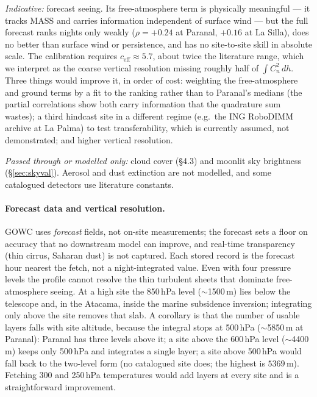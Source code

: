 \documentclass[11pt]{article}
\begin{document}
\emph{Indicative:} forecast seeing. Its free-atmosphere term is physically
meaningful --- it tracks MASS and carries information independent of surface wind ---
but the full forecast ranks nights only weakly ($\rho=+0.24$ at Paranal, $+0.16$ at
La Silla), does no better than surface wind or persistence, and has no site-to-site
skill in absolute scale. The calibration requires $c_{\text{eff}}\approx5.7$, about
twice the literature range, which we interpret as the coarse vertical resolution
missing roughly half of $\int C_n^2\,dh$. Three things would improve it, in order of
cost: weighting the free-atmosphere and ground terms by a fit to the ranking rather
than to Paranal's medians (the partial correlations show both carry information that
the quadrature sum wastes); a third hindcast site in a different regime (e.g.\ the ING
RoboDIMM archive at La Palma) to test transferability, which is currently assumed,
not demonstrated; and higher vertical resolution.

\emph{Passed through or modelled only:} cloud cover (\S4.3) and moonlit sky
brightness (\S\ref{sec:skyval}). Aerosol and dust extinction are not modelled, and
some catalogued detectors use literature constants.

\paragraph{Forecast data and vertical resolution.}
\label{sec:dimm-inv}
GOWC uses \emph{forecast} fields, not on-site measurements; the forecast sets a floor
on accuracy that no downstream model can improve, and real-time transparency (thin
cirrus, Saharan dust) is not captured. Each stored record is the forecast hour nearest
the fetch, not a night-integrated value. Even with four pressure levels the profile
cannot resolve the thin turbulent sheets that dominate free-atmosphere seeing. At a
high site the 850\,hPa level ($\sim$1500\,m) lies below the telescope and, in the
Atacama, inside the marine subsidence inversion; integrating only above the site
removes that slab. A corollary is that the number of usable layers falls with site
altitude, because the integral stops at 500\,hPa ($\sim$5850\,m at Paranal): Paranal
has three levels above it; a site above the 600\,hPa level ($\sim$4400\,m) keeps only
500\,hPa and integrates a single layer; a site above 500\,hPa would fall back to the
two-level form (no catalogued site does; the highest is $5369$\,m). Fetching 300 and
250\,hPa temperatures would add layers at every site and is a straightforward
improvement.
\end{document}

